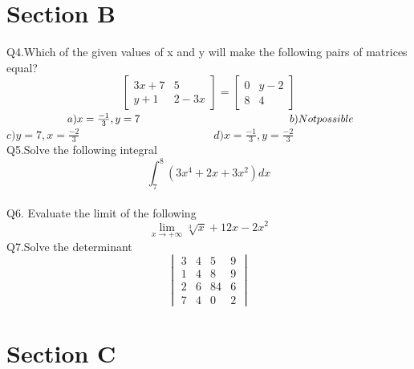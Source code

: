 \documentclass[12pt]{article}
\begin{document}
\section*{Section B}
	Q4.Which of the given values of x and y will make the following pairs of matrices equal?
	\begin{equation*}
		\begin{bmatrix}3x+7&5\\y+1&2-3x
		\end{bmatrix}=
		\begin{bmatrix}0&y-2\\8&4
		\end{bmatrix}
	\end{equation*}
	\vspace{0.5cm}
	$\hspace{2cm}a)x=\frac{-1}{3},y=7 \hspace{5cm} b)Not possible\newline \hspace*{1.85cm}$
	$ c)y=7,x=\frac{-2}{3} \hspace{5cm} d)x=\frac{-1}{3},y=\frac{-2}{3}$
	\\
	Q5.Solve the following integral
	\begin{equation*}
		\int_{7}^8 (3x^4+2x+3x^2)dx
	\end{equation*}
	\\
	Q6. Evaluate the limit of the following
	\begin{equation*}
		\lim_{x \to +\infty}\sqrt[3]{x}+12x-2x^2
	\end{equation*}
	Q7.Solve the determinant
	\begin{equation*}
		\begin{vmatrix}3&4&5&9\\1&4&8&9\\2&6&84&6\\7&4&0&2
		\end{vmatrix}	
	\end{equation*}
\section*{Section C}
\end{document}
